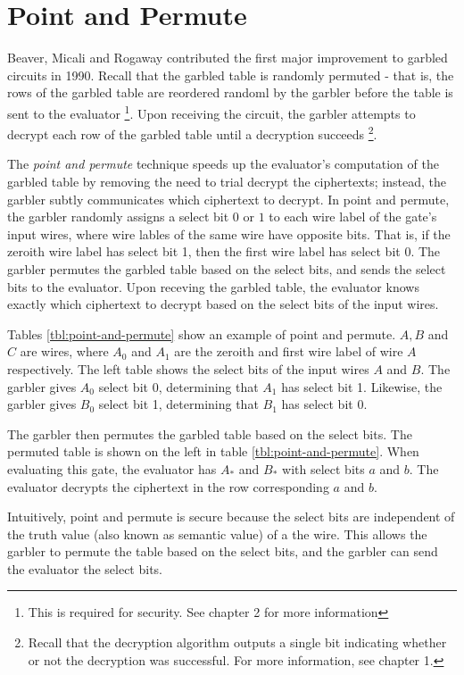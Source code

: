 \section{Point and Permute}

Beaver, Micali and Rogaway contributed the first major improvement to garbled circuits in 1990.
Recall that the garbled table is randomly permuted - that is, the rows of the garbled table are reordered randoml by the garbler before the table is sent to the evaluator \footnote{This is required for security. See chapter 2 for more information}.
Upon receiving the circuit, the garbler attempts to decrypt each row of the garbled table until a decryption succeeds \footnote{Recall that the decryption algorithm outputs a single bit indicating whether or not the decryption was successful. For more information, see chapter 1.}.

The \textit{point and permute} technique speeds up the evaluator's computation of the garbled table by removing the need to trial decrypt the ciphertexts; instead, the garbler subtly communicates which ciphertext to decrypt.
In point and permute, the garbler randomly assigns a select bit $0$ or $1$ to each wire label of the gate's input wires, where wire lables of the same wire have opposite bits.
That is, if the zeroith wire label has select bit 1, then the first wire label has select bit 0.
The garbler permutes the garbled table based on the select bits, and sends the select bits to the evaluator.
Upon receving the garbled table, the evaluator knows exactly which ciphertext to decrypt based on the select bits of the input wires.

Tables \ref{tbl:point-and-permute} show an example of point and permute.
$A, B$ and $C$ are wires, where $A_0$ and $A_1$ are the zeroith and first wire label of wire $A$ respectively.
The left table shows the select bits of the input wires $A$ and $B$.
The garbler gives $A_0$ select bit 0, determining that $A_1$ has select bit 1.
Likewise, the garbler gives $B_0$ select bit 1, determining that $B_1$ has select bit 0.

The garbler then permutes the garbled table based on the select bits. 
The permuted table is shown on the left in table \ref{tbl:point-and-permute}.
When evaluating this gate, the evaluator has $A_*$ and $B_*$ with select bits $a$ and $b$.
The evaluator decrypts the ciphertext in the row corresponding $a$ and $b$.

Intuitively, point and permute is secure because the select bits are independent of the truth value (also known as semantic value) of a the wire.
This allows the garbler to permute the table based on the select bits, and the garbler can send the evaluator the select bits.

